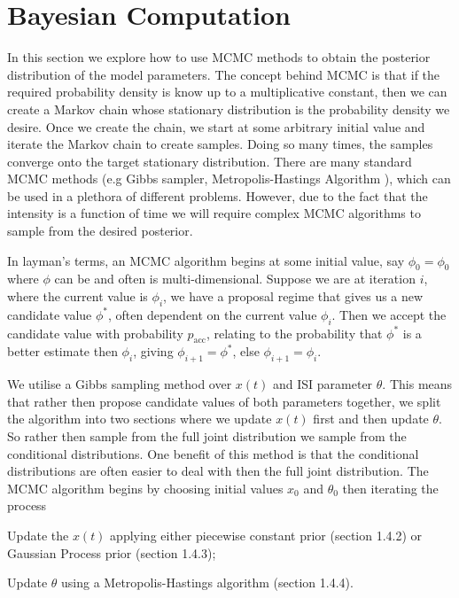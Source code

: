 \documentclass[../main.tex]{subfiles}
\begin{document}
\section{Bayesian Computation}
In this section we explore how to use MCMC methods to obtain the posterior distribution of the model parameters. The concept behind MCMC is that if the required probability density is know up to a multiplicative constant, then we can create a Markov chain whose stationary distribution is the probability density we desire. Once we create the chain, we start at some arbitrary initial value and iterate the Markov chain to create samples. Doing so many times, the samples converge onto the target stationary distribution. There are many standard MCMC methods (e.g Gibbs sampler, Metropolis-Hastings Algorithm \cite{Gibbs, Hastings}), which can be used in a plethora of different problems. However, due to the fact that the intensity is a function of time we will require complex MCMC algorithms to sample from the desired posterior.

In layman's terms, an MCMC algorithm begins at some initial value, say $\phi_0 = \phi_0$ where $\phi$ can be and often is multi-dimensional. Suppose we are at iteration $i$, where the current value is $\phi_i$, we have a proposal regime that gives us a new candidate value $\phi^*$, often dependent on the current value $\phi_i$.  Then we accept the candidate value with probability $p_\mathrm{acc}$, relating to the probability that $\phi^*$ is a better estimate then $\phi_i$, giving $\phi_{i+1} = \phi^*$, else $\phi_{i+1} = \phi_i$.

We utilise a Gibbs sampling method over $x(t)$ and  ISI parameter $\theta$. This means that rather then propose candidate values of both parameters together, we split the algorithm into two sections where  we update $x(t)$ first and then update $\theta$.  So rather then sample from the full joint distribution we sample from the conditional distributions. One benefit of this method is that the conditional distributions are often easier to deal with then the full joint distribution. 
The MCMC algorithm begins by choosing initial values $x_0$ and $\theta_0$ then iterating the process 

\begin{steps}
\item Update the $x(t)$ applying either piecewise constant prior (section 1.4.2) or Gaussian Process prior (section 1.4.3);
\item Update $\theta$ using a Metropolis-Hastings algorithm  (section 1.4.4).
\end{steps}
\end{document}
